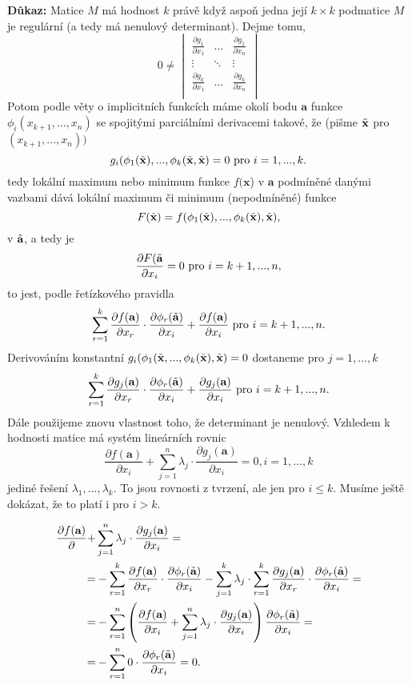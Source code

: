 \documentclass[../main.tex]{subfiles}
\begin{document}
\vspace{5mm}
\noindent
\textbf{Důkaz:} Matice $M$ má hodnost $k$ právě když aspoň jedna její $k\times k$ podmatice $M$ je regulární (a tedy má nenulový determinant). Dejme tomu,
\[ 0 \neq \begin{vmatrix}
\frac{\partial g_1}{\partial x_1} & \dots & \frac{\partial g_1}{\partial x_n}\\
\vdots & \ddots & \vdots\\
\frac{\partial g_k}{\partial x_1} & \dots & \frac{\partial g_k}{\partial x_n}\\
\end{vmatrix}\]
Potom podle věty o implicitních funkcích máme okolí bodu $\textbf{a}$ funkce $\phi_i(x_{k+1},...,x_n)$
se spojitými parciálními derivacemi takové, že (pišme $\Tilde{\textbf{x}}$ pro $(x_{k+1},...,x_n))$
\[g_i(\phi_1(\Tilde{\textbf{x}}),...,\phi_k(\Tilde{\textbf{x}},\Tilde{\textbf{x}}) = 0 \text{ pro } i=1,...,k.\]
tedy lokální maximum nebo minimum funkce $f(\textbf{x}$) v $\textbf{a}$ podmíněné danými vazbami dává lokální maximum či minimum (nepodmíněné) funkce
\[F(\Tilde{\textbf{x}}) = f(\phi_1(\Tilde{\textbf{x}}),...,\phi_k(\Tilde{\textbf{x}}),\Tilde{\textbf{x}}),\]
v $\Tilde{\textbf{a}}$, a tedy je 
\[\frac{\partial F(\Tilde{\textbf{a}}}{\partial x_i} = 0 \text{ pro } i = k+1,...,n,\]
to jest, podle řetízkového pravidla
\[\sum^k_{r=1}\frac{\partial f(\textbf{a})}{\partial x_r}\cdot \frac{\partial \phi_r(\Tilde{\textbf{a}})}{\partial x_i} + \frac{\partial f(\textbf{a})}{\partial x_i} \text{ pro } i = k+1,...,n.\]
Derivováním konstantní $g_i(\phi_1(\Tilde{\textbf{x}},...,\phi_k(\Tilde{\textbf{x}}),\Tilde{\textbf{x}}) = 0$ dostaneme pro $j = 1,...,k$
\[\sum^k_{r=1}\frac{\partial g_j(\textbf{a})}{\partial x_r}\cdot \frac{\partial \phi_r(\Tilde{\textbf{a}})}{\partial x_i} + \frac{\partial g_j(\textbf{a})}{\partial x_i} \text{ pro } i = k+1,...,n.\]
Dále použijeme znovu vlastnost toho, že determinant je nenulový. Vzhledem k hodnosti matice má systém lineárních rovnic
\[\frac{\partial f(\textbf{a})}{\partial x_i} + \sum^n_{j=1}\lambda_j\cdot\frac{\partial g_j(\textbf{a})}{\partial x_i} = 0, i = 1,...,k\]
jediné řešení $\lambda_1,...,\lambda_k.$ To jsou rovnosti z tvrzení, ale jen pro $i \leq k$. Musíme ještě dokázat, že to platí i pro $i > k$. 

\begin{align*}
\frac{\partial f(\textbf{a})}{\partial} + & \sum^n_{j=1}\lambda_j\cdot\frac{\partial g_j(\textbf{a})}{\partial x_i}=\\
= & - \sum^k_{r=1} \frac{\partial f(\textbf{a})}{\partial x_r}\cdot\frac{\partial \phi_r(\Tilde{\textbf{a}})}{\partial x_i} -
\sum^k_{j=1}\lambda_j\cdot\sum^k_{r=1}\frac{\partial g_j(\textbf{a})}{\partial x_r}\cdot\frac{\partial \phi_r(\Tilde{\textbf{a}})}{\partial x_i} =\\
= & - \sum^n_{r=1}\left(\frac{\partial f(\textbf{a})}{\partial x_i}+\sum^n_{j=1}\lambda_j\cdot\frac{\partial g_j(\textbf{a})}{\partial x_i}\right)\frac{\partial \phi_r(\Tilde{\textbf{a}})}{\partial x_i}=\\
= & - \sum^n_{r=1}0\cdot\frac{\partial \phi_r(\Tilde{\textbf{a}})}{\partial x_i}=0.
\end{align*}
\end{document}

